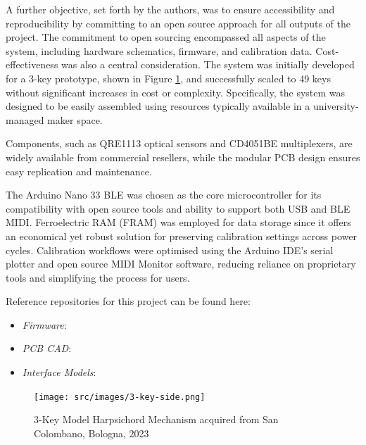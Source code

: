 A further objective, set forth by the authors, was to ensure accessibility and reproducibility by committing to an open source approach for all outputs of the project. The commitment to open sourcing encompassed all aspects of the system, including hardware schematics, firmware, and calibration data. Cost-effectiveness was also a central consideration. The system was initially developed for a 3-key prototype, shown in Figure \ref{fig:3key}, and successfully scaled to 49 keys without significant increases in cost or complexity. Specifically, the system was designed to be easily assembled using resources typically available in a university-managed maker space.


Components, such as QRE1113 optical sensors and CD4051BE multiplexers, are widely available from commercial resellers, while the modular PCB design ensures easy replication and maintenance.

The Arduino Nano 33 BLE was chosen as the core microcontroller for its compatibility with open source tools and ability to support both USB and BLE MIDI. Ferroelectric RAM (FRAM) was employed for data storage since it offers an economical yet robust solution for preserving calibration settings across power cycles. Calibration workflows were optimised using the Arduino IDE’s serial plotter and open source MIDI Monitor software, reducing reliance on proprietary tools and simplifying the process for users. 

\begin{anonsuppress}
Reference repositories for this project can be found here:

    \begin{itemize}
        \item 
        \emph{Firmware}: 
        \item 
        \emph{PCB CAD}: 
        \item 
        \emph{Interface Models}: 
    \end{itemize}
\end{anonsuppress}


\begin{figure}[!b]
    \centering    
    \texttt{[image: src/images/3-key-side.png]}
    \caption{3-Key Model Harpsichord Mechanism acquired from San Colombano, Bologna, 2023}
    \label{fig:3key}
\end{figure}

